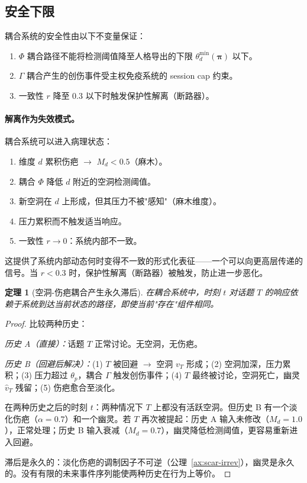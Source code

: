 \documentclass[11pt]{article}
\newtheorem{theorem}{定理}[section]
\begin{document}
\subsection{安全下限}

耦合系统的安全性由以下不变量保证：
\begin{enumerate}
\item $\Phi$ 耦合路径不能将检测阈值降至人格导出的下限 $\theta_d^{\min}(\boldsymbol{\pi})$ 以下。
\item $\Gamma$ 耦合产生的创伤事件受主权免疫系统的 session cap 约束。
\item 一致性 $r$ 降至 0.3 以下时触发保护性解离（断路器）。
\end{enumerate}

\paragraph{解离作为失效模式。}
耦合系统可以进入病理状态：
\begin{enumerate}
\item 维度 $d$ 累积伤疤 $\to$ $M_d < 0.5$（麻木）。
\item 耦合 $\Phi$ 降低 $d$ 附近的空洞检测阈值。
\item 新空洞在 $d$ 上形成，但其压力不被"感知"（麻木维度）。
\item 压力累积而不触发适当响应。
\item 一致性 $r \to 0$：系统内部不一致。
\end{enumerate}
这提供了系统内部动态何时变得不一致的形式化表征——一个可以向更高层传递的信号。当 $r < 0.3$ 时，保护性解离（断路器）被触发，防止进一步恶化。

\begin{theorem}[空洞-伤疤耦合产生永久滞后]
\label{thm:void-hysteresis}
在耦合系统中，时刻 $t$ 对话题 $T$ 的响应依赖于系统到达当前状态的路径，即使当前"存在"组件相同。
\end{theorem}

\begin{proof}
比较两种历史：

\emph{历史 A（直接）：}话题 $T$ 正常讨论。无空洞，无伤疤。

\emph{历史 B（回避后解决）：}(1) $T$ 被回避 $\to$ 空洞 $v_T$ 形成；(2) 空洞加深，压力累积；(3) 压力超过 $\theta_p$，耦合 $\Gamma$ 触发创伤事件；(4) $T$ 最终被讨论，空洞死亡，幽灵 $\hat{v}_T$ 残留；(5) 伤疤愈合至淡化。

在两种历史之后的时刻 $t$：两种情况下 $T$ 上都没有活跃空洞。但历史 B 有一个淡化伤疤（$\alpha = 0.7$）和一个幽灵。若 $T$ 再次被提起：历史 A 输入未修改（$M_d = 1.0$），正常处理；历史 B 输入衰减（$M_d = 0.7$），幽灵降低检测阈值，更容易重新进入回避。

滞后是永久的：淡化伤疤的调制因子不可逆（公理~\ref{ax:scar-irrev}），幽灵是永久的。没有有限的未来事件序列能使两种历史在行为上等价。
\end{proof}
\end{document}
